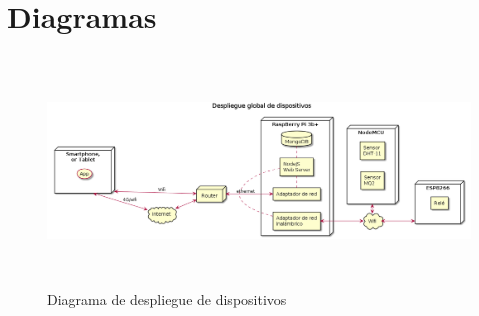 
\cleardoublepage

\chapter{Diagramas}
\label{AppendiC:Key1}

\begin{figure}[hbt!]
\centering
\includegraphics[height=2.4in]{figures/diagrams/physical-devices/global.png}
\caption[Diagrama de despiegue de dispositivos]{Diagrama de despliegue de dispositivos\footnotemark}
\end{figure}

